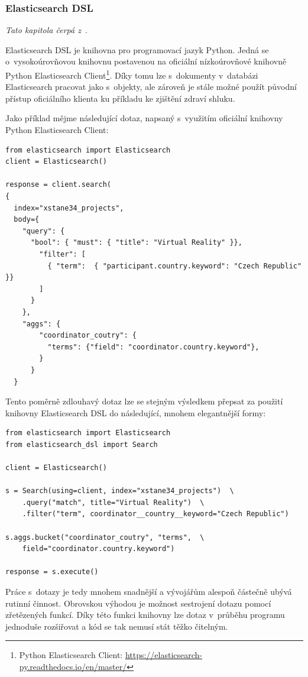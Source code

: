 \subsubsection*{Elasticsearch DSL}
\emph{Tato kapitola čerpá z~\cite{bib:elastic-dsl}}.

Elasticsearch DSL je knihovna pro programovací jazyk Python. Jedná se o~vysokoúrovňovou knihovnu postavenou na oficiální nízkoúrovňové knihovně Python Elasticsearch Client\footnote{Python Elasticsearch Client: \url{https://elasticsearch-py.readthedocs.io/en/master/}}. Díky tomu lze s~dokumenty v~databázi Elasticsearch pracovat jako s~objekty, ale zároveň je stále možné použít původní přístup oficiálního klienta ku příkladu ke zjištění zdraví shluku.

Jako příklad mějme následující dotaz, napsaný s~využitím oficiální knihovny Python Elasticsearch Client:
\begin{verbatim}
from elasticsearch import Elasticsearch
client = Elasticsearch()

response = client.search(
{
  index="xstane34_projects",
  body={
    "query": { 
      "bool": { "must": { "title": "Virtual Reality" }}, 
        "filter": [ 
          { "term":  { "participant.country.keyword": "Czech Republic" }}
        ]
      }
    },
    "aggs": {
        "coordinator_coutry": {
          "terms": {"field": "coordinator.country.keyword"},
        }
      }
  }
\end{verbatim}

Tento poměrně zdlouhavý dotaz lze se stejným výsledkem přepsat za použití knihovny Elasticsearch DSL do následující, mnohem elegantnější formy:

\begin{verbatim}
from elasticsearch import Elasticsearch
from elasticsearch_dsl import Search

client = Elasticsearch()

s = Search(using=client, index="xstane34_projects")  \
    .query("match", title="Virtual Reality")  \
    .filter("term", coordinator__country__keyword="Czech Republic")

s.aggs.bucket("coordinator_coutry", "terms",  \
    field="coordinator.country.keyword")

response = s.execute()
\end{verbatim}

Práce s~dotazy je tedy mnohem snadnější a vývojářům alespoň částečně ubývá rutinní činnost. Obrovskou výhodou je možnost sestrojení dotazu pomocí zřetězených funkcí. Díky této funkci knihovny lze dotaz v~průběhu programu jednoduše rozšiřovat a kód se tak nemusí stát těžko čitelným.

